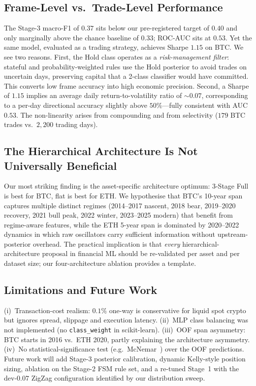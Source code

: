 \documentclass[conference]{IEEEtran}
\begin{document}
\subsection{Frame-Level vs.~Trade-Level Performance}
The Stage-3 macro-F1 of $0.37$ sits below our pre-registered target of $0.40$ and only marginally above the chance baseline of $0.33$; ROC-AUC sits at $0.53$. Yet the same model, evaluated as a trading strategy, achieves Sharpe $1.15$ on BTC. We see two reasons. First, the Hold class operates as a \emph{risk-management filter}: stateful and probability-weighted rules use the Hold posterior to avoid trades on uncertain days, preserving capital that a 2-class classifier would have committed. This converts low frame accuracy into high economic precision. Second, a Sharpe of $1.15$ implies an average daily return-to-volatility ratio of $\sim 0.07$, corresponding to a per-day directional accuracy slightly above $50\%$---fully consistent with AUC $0.53$. The non-linearity arises from compounding and from selectivity ($179$ BTC trades vs.~$2{,}200$ trading days).

\subsection{The Hierarchical Architecture Is Not Universally Beneficial}
Our most striking finding is the asset-specific architecture optimum: 3-Stage Full is best for BTC, flat is best for ETH. We hypothesise that BTC's 10-year span captures multiple distinct regimes (2014--2017 nascent, 2018 bear, 2019--2020 recovery, 2021 bull peak, 2022 winter, 2023--2025 modern) that benefit from regime-aware features, while the ETH 5-year span is dominated by 2020--2022 dynamics in which raw oscillators carry sufficient information without upstream-posterior overhead. The practical implication is that \emph{every} hierarchical-architecture proposal in financial ML should be re-validated per asset and per dataset size; our four-architecture ablation provides a template.

\subsection{Limitations and Future Work}
(i)~Transaction-cost realism: $0.1\%$ one-way is conservative for liquid spot crypto but ignores spread, slippage and execution latency. (ii)~MLP class balancing was not implemented (no \texttt{class\_weight} in scikit-learn). (iii)~OOF span asymmetry: BTC starts in 2016 vs.~ETH 2020, partly explaining the architecture asymmetry. (iv)~No statistical-significance test (e.g.~McNemar~\cite{dietterich1998statistical}) over the OOF predictions. Future work will add Stage-3 posterior calibration, dynamic Kelly-style position sizing, ablation on the Stage-2 FSM rule set, and a re-tuned Stage~1 with the dev-$0.07$ ZigZag configuration identified by our distribution sweep.
\end{document}
